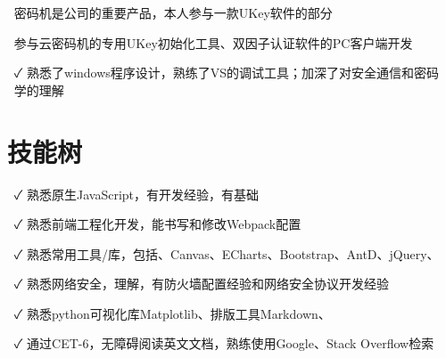 \documentclass[14pt]{resume}
\begin{document}
\begin{itemize}
    \item[\faFlagO] 密码机是公司的重要产品，本人参与一款UKey软件的\textbf{\color{red}{windows开发}}部分
    \item[\faCode] 参与云密码机的专用UKey初始化工具、双因子认证软件的PC客户端开发
    \item[\faCheck] 熟悉了windows程序设计，熟练了VS的调试工具；加深了对安全通信和密码学的理解
\end{itemize}


\section{\faCogs\ 技能树}

\begin{itemize}
    \item[\faCheck] 熟悉原生JavaScript，有\textbf{\color{red}{H5移动端小游戏}}开发经验，有\textbf{\color{red}{python}}基础
    \item[\faCheck] 熟悉前端工程化开发，能书写和修改Webpack配置
    \item[\faCheck] 熟悉常用工具/库，包括\textbf{\color{red}{React.js}}、Canvas、ECharts、Bootstrap、AntD、jQuery、
    \item[\faCheck] 熟悉网络安全，理解\textbf{\color{red}{HTTPS}}，有防火墙配置经验和网络安全协议开发经验
    \item[\faCheck] 熟悉python可视化库Matplotlib、排版工具Markdown、\textbf{\color{red}{LaTex}}
    \item[\faCheck] 通过CET-6，无障碍阅读英文文档，熟练使用Google、Stack Overflow检索
\end{itemize}
\end{document}
